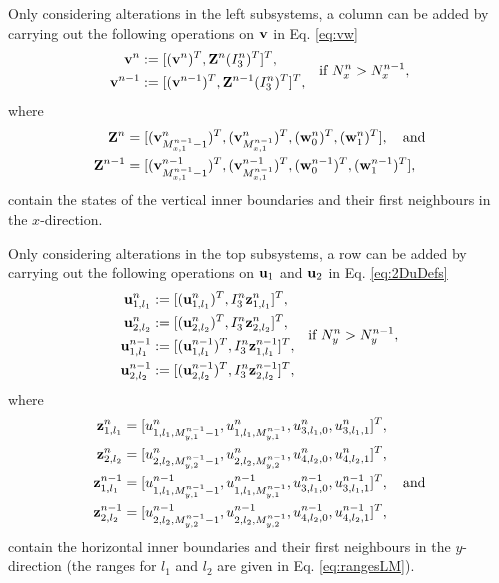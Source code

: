\documentclass[fleqn]{jaes}
\begin{document}
Only considering alterations in the left subsystems, a column can be added by carrying out the following operations on $\mathbf{v}$ in Eq. \eqref{eq:vw}
\begin{equation}
\begin{aligned}
   \v^n &:= [(\v^n)^T, \Z^n(I_3^n)^T]^T,\\
   \v^{n-1} &:= [(\v^{n-1})^T, \Z^{n-1}(I_3^n)^T]^T,
   \end{aligned} \quad \text{if } N_x^n > N_x^{n-1},
\end{equation}
where
\begin{align*}
\Z^n &= [(\v_{M_{x,1}^{n-1}-1}^n)^T, (\v_{M_{x,1}^{n-1}}^n)^T, (\w_{0}^n)^T, (\w_{1}^n)^T], \quad \text{and}\\
\Z^{n-1} &= [(\v_{M_{x,1}^{n-1}-1}^{n-1})^T, (\v_{M_{x,1}^{n-1}}^{n-1})^T, (\w_{0}^{n-1})^T, (\w_{1}^{n-1})^T],
\end{align*}
contain the states of the vertical inner boundaries and their first neighbours in the $x$-direction. 

Only considering alterations in the top subsystems, a row can be added by carrying out the following operations on $\mathbf{u}_1$ and $\mathbf{u}_2$ in Eq. \eqref{eq:2DuDefs} 
\begin{equation*}
    \begin{aligned}
        \u_{1,l_1}^n &:= [(\u_{1,l_1}^n)^T, I_3^n \z_{1, l_1}^n]^T,\\
        \u_{2,l_2}^n &:= [(\u_{2,l_2}^n)^T, I_3^n \z_{2, l_2}^n]^T,\\
        \u_{1,l_1}^{n-1} &:= [(\u_{1,l_1}^{n-1})^T, I_3^n \z_{1, l_1}^{n-1}]^T,\\
        \u_{2,l_2}^{n-1} &:= [(\u_{2,l_2}^{n-1})^T, I_3^n \z_{2, l_2}^{n-1}]^T,
    \end{aligned}\quad \text{if } N_y^n > N_y^{n-1},
\end{equation*}
where 
\begin{align*}
    \z_{1,l_1}^n &= [u_{1, l_1, M_{y,1}^{n-1}-1}^n, u_{1, l_1, M_{y,1}^{n-1}}^n, u_{3, l_1, 0}^n, u_{3, l_1, 1}^n]^T,\\
    \z_{2,l_2}^n &= [u_{2, l_2, M_{y,2}^{n-1}-1}^n, u_{2, l_2, M_{y,2}^{n-1}}^n, u_{4, l_2, 0}^n, u_{4, l_2, 1}^n]^T,\\
    \z_{1,l_1}^{n-1} &= [u_{1, l_1, M_{y,1}^{n-1}-1}^{n-1}, u_{1, l_1, M_{y,1}^{n-1}}^{n-1}, u_{3, l_1, 0}^{n-1}, u_{3, l_1, 1}^{n-1}]^T, \quad \text{and}\\
    \z_{2,l_2}^{n-1} &= [u_{2, l_2, M_{y,2}^{n-1}-1}^{n-1}, u_{2, l_2, M_{y,2}^{n-1}}^{n-1}, u_{4, l_2, 0}^{n-1}, u_{4, l_2, 1}^{n-1}]^T,
\end{align*}
contain the horizontal inner boundaries and their first neighbours in the $y$-direction (the ranges for $l_1$ and $l_2$ are given in Eq. \eqref{eq:rangesLM}).
\end{document}
